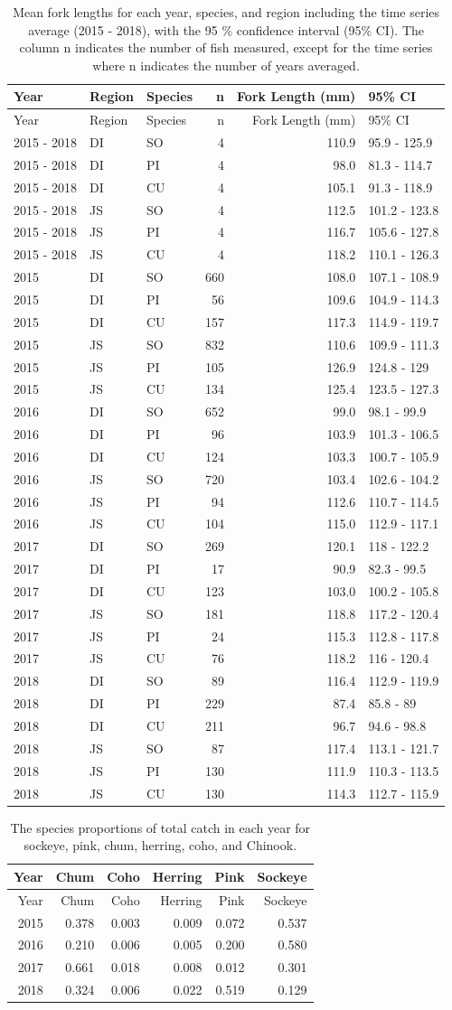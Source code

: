 \documentclass[fleqn,10pt]{wlpeerj} %
\begin{document}
\begin{longtable}[]{@{}lllrrl@{}}
\caption{\label{tab:length} Mean fork lengths for each year, species, and
region including the time series average (2015 - 2018), with the 95 \%
confidence interval (95\% CI). The column n indicates the number of fish
measured, except for the time series where n indicates the number of
years averaged.}\tabularnewline
\toprule
Year & Region & Species & n & Fork Length (mm) & 95\% CI\tabularnewline
\midrule
\endfirsthead
\toprule
Year & Region & Species & n & Fork Length (mm) & 95\% CI\tabularnewline
\midrule
\endhead
2015 - 2018 & DI & SO & 4 & 110.9 & 95.9 - 125.9\tabularnewline
2015 - 2018 & DI & PI & 4 & 98.0 & 81.3 - 114.7\tabularnewline
2015 - 2018 & DI & CU & 4 & 105.1 & 91.3 - 118.9\tabularnewline
2015 - 2018 & JS & SO & 4 & 112.5 & 101.2 - 123.8\tabularnewline
2015 - 2018 & JS & PI & 4 & 116.7 & 105.6 - 127.8\tabularnewline
2015 - 2018 & JS & CU & 4 & 118.2 & 110.1 - 126.3\tabularnewline
2015 & DI & SO & 660 & 108.0 & 107.1 - 108.9\tabularnewline
2015 & DI & PI & 56 & 109.6 & 104.9 - 114.3\tabularnewline
2015 & DI & CU & 157 & 117.3 & 114.9 - 119.7\tabularnewline
2015 & JS & SO & 832 & 110.6 & 109.9 - 111.3\tabularnewline
2015 & JS & PI & 105 & 126.9 & 124.8 - 129\tabularnewline
2015 & JS & CU & 134 & 125.4 & 123.5 - 127.3\tabularnewline
2016 & DI & SO & 652 & 99.0 & 98.1 - 99.9\tabularnewline
2016 & DI & PI & 96 & 103.9 & 101.3 - 106.5\tabularnewline
2016 & DI & CU & 124 & 103.3 & 100.7 - 105.9\tabularnewline
2016 & JS & SO & 720 & 103.4 & 102.6 - 104.2\tabularnewline
2016 & JS & PI & 94 & 112.6 & 110.7 - 114.5\tabularnewline
2016 & JS & CU & 104 & 115.0 & 112.9 - 117.1\tabularnewline
2017 & DI & SO & 269 & 120.1 & 118 - 122.2\tabularnewline
2017 & DI & PI & 17 & 90.9 & 82.3 - 99.5\tabularnewline
2017 & DI & CU & 123 & 103.0 & 100.2 - 105.8\tabularnewline
2017 & JS & SO & 181 & 118.8 & 117.2 - 120.4\tabularnewline
2017 & JS & PI & 24 & 115.3 & 112.8 - 117.8\tabularnewline
2017 & JS & CU & 76 & 118.2 & 116 - 120.4\tabularnewline
2018 & DI & SO & 89 & 116.4 & 112.9 - 119.9\tabularnewline
2018 & DI & PI & 229 & 87.4 & 85.8 - 89\tabularnewline
2018 & DI & CU & 211 & 96.7 & 94.6 - 98.8\tabularnewline
2018 & JS & SO & 87 & 117.4 & 113.1 - 121.7\tabularnewline
2018 & JS & PI & 130 & 111.9 & 110.3 - 113.5\tabularnewline
2018 & JS & CU & 130 & 114.3 & 112.7 - 115.9\tabularnewline
\bottomrule
\end{longtable}

\begin{longtable}[]{@{}rrrrrr@{}}
\caption{\label{tab:proptable} The species proportions of total catch in
each year for sockeye, pink, chum, herring, coho, and
Chinook.}\tabularnewline
\toprule
Year & Chum & Coho & Herring & Pink & Sockeye\tabularnewline
\midrule
\endfirsthead
\toprule
Year & Chum & Coho & Herring & Pink & Sockeye\tabularnewline
\midrule
\endhead
2015 & 0.378 & 0.003 & 0.009 & 0.072 & 0.537\tabularnewline
2016 & 0.210 & 0.006 & 0.005 & 0.200 & 0.580\tabularnewline
2017 & 0.661 & 0.018 & 0.008 & 0.012 & 0.301\tabularnewline
2018 & 0.324 & 0.006 & 0.022 & 0.519 & 0.129\tabularnewline
\bottomrule
\end{longtable}
\end{document}
